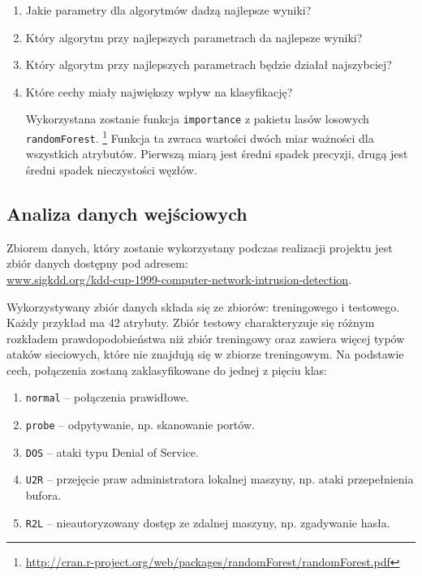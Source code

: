 \documentclass[a4paper, 12pt]{article}
\begin{document}
\begin{enumerate}
 \item Jakie parametry dla algorytmów dadzą najlepsze wyniki?
 \item Który algorytm przy najlepszych parametrach da najlepsze wyniki?
 \item Który algorytm przy najlepszych parametrach będzie działał najszybciej?
 \item Które cechy miały największy wpływ na klasyfikację?

Wykorzystana zostanie funkcja \texttt{importance} z pakietu lasów losowych \texttt{randomForest}.
\footnote{\url{http://cran.r-project.org/web/packages/randomForest/randomForest.pdf}}
Funkcja ta zwraca wartości dwóch miar ważności dla wszystkich atrybutów.
Pierwszą miarą jest średni spadek precyzji, drugą jest średni spadek nieczystości węzłów.
\end{enumerate}

\subsection{Analiza danych wejściowych}

Zbiorem danych, który zostanie wykorzystany podczas realizacji projektu jest zbiór danych dostępny 
pod adresem: \\
\url{www.sigkdd.org/kdd-cup-1999-computer-network-intrusion-detection}.

Wykorzystywany zbiór danych składa się ze zbiorów: treningowego i testowego.
Każdy przykład ma 42 atrybuty.
Zbiór testowy charakteryzuje się różnym rozkładem prawdopodobieństwa niż zbiór treningowy oraz
zawiera więcej typów ataków sieciowych, które nie znajdują się w zbiorze treningowym.
Na podstawie cech, połączenia zostaną zaklasyfikowane do jednej z pięciu klas:

\begin{enumerate}
 \item \texttt{normal} -- połączenia prawidłowe.
 \item \texttt{probe} -- odpytywanie, np. skanowanie portów.
 \item \texttt{DOS} -- ataki typu Denial of Service.
 \item \texttt{U2R} -- przejęcie praw administratora lokalnej maszyny, np. ataki przepełnienia bufora.
 \item \texttt{R2L} -- nieautoryzowany dostęp ze zdalnej maszyny, np. zgadywanie hasła.
\end{enumerate}
\end{document}
